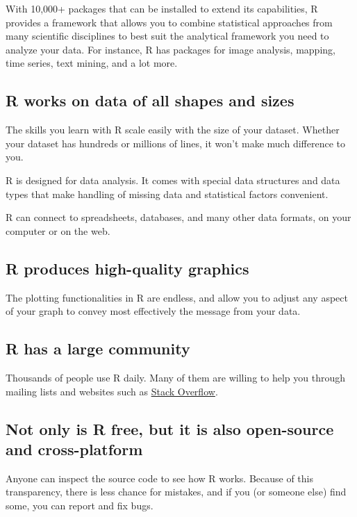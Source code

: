 \documentclass[]{book}
\theoremstyle{definition}
\theoremstyle{definition}
\theoremstyle{definition}
\theoremstyle{remark}
\begin{document}
With 10,000+ packages that can be installed to extend its capabilities,
R provides a framework that allows you to combine statistical approaches
from many scientific disciplines to best suit the analytical framework
you need to analyze your data. For instance, R has packages for image
analysis, mapping, time series, text mining, and a lot more.

\subsection{R works on data of all shapes and
sizes}\label{r-works-on-data-of-all-shapes-and-sizes}

The skills you learn with R scale easily with the size of your dataset.
Whether your dataset has hundreds or millions of lines, it won't make
much difference to you.

R is designed for data analysis. It comes with special data structures
and data types that make handling of missing data and statistical
factors convenient.

R can connect to spreadsheets, databases, and many other data formats,
on your computer or on the web.

\subsection{R produces high-quality
graphics}\label{r-produces-high-quality-graphics}

The plotting functionalities in R are endless, and allow you to adjust
any aspect of your graph to convey most effectively the message from
your data.

\subsection{R has a large community}\label{r-has-a-large-community}

Thousands of people use R daily. Many of them are willing to help you
through mailing lists and websites such as
\href{https://stackoverflow.com/questions/tagged/r}{Stack Overflow}.

\subsection{Not only is R free, but it is also open-source and
cross-platform}\label{not-only-is-r-free-but-it-is-also-open-source-and-cross-platform}

Anyone can inspect the source code to see how R works. Because of this
transparency, there is less chance for mistakes, and if you (or someone
else) find some, you can report and fix bugs.
\end{document}
